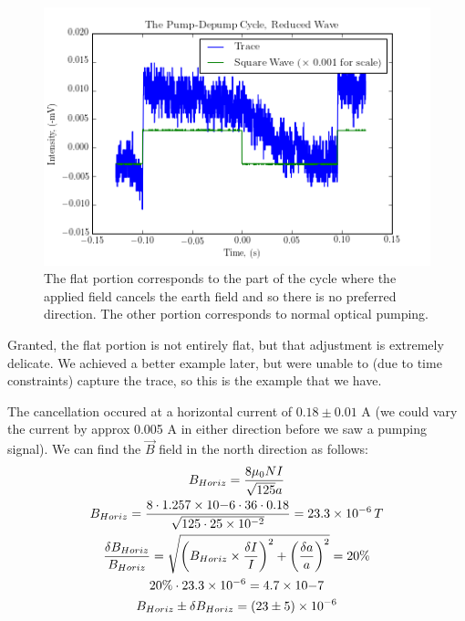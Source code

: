 \documentclass{article}
\DeclarePairedDelimiter{\parens}{\lparen}{\rparen}
\begin{document}
    \begin{figure}[!htb]
      \centering
      \includegraphics[scale=.75]{../plots/reduced_wave.png}
      \caption{The flat portion corresponds to the part of the cycle where the applied field cancels the earth field and so there is no preferred direction.  The other portion corresponds to normal optical pumping.}
      \label{reduced}
    \end{figure}

    Granted, the flat portion is not entirely flat, but that adjustment is extremely delicate.  We achieved a better example later, but were unable to (due to time constraints) capture the trace, so this is the example that we have.

    \hspace{.25cm}

    The cancellation occured at a horizontal current of $0.18 \pm 0.01$ A (we could vary the current by approx 0.005 A in either direction before we saw a pumping signal).  We can find the $\vec{B}$ field in the north direction as follows:
    \begin{gather*}
      B_{Horiz} = \frac{8 \mu_0 N I}{\sqrt{125} a} \\
      B_{Horiz} = \frac{8 \cdot 1.257\times10{-6} \cdot 36 \cdot 0.18}{\sqrt{125 \cdot 25\times10^{-2}}} = 23.3\times10^{-6} \, T \\
      \frac{\delta B_{Horiz}}{B_{Horiz}} = \sqrt{\parens*{B_{Horiz}\times\frac{\delta I}{I}}^2 + \parens*{\frac{\delta a}{a}}^2} = 20\% \\
      20\%\cdot 23.3\times10^{-6} = 4.7\times10{-7} \\
      B_{Horiz} \pm \delta B_{Horiz} = (23 \pm 5) \times 10^{-6}
    \end{gather*}
\end{document}

